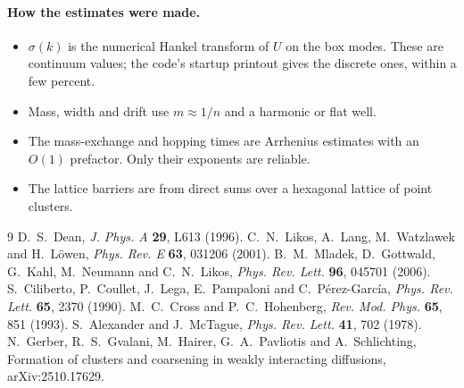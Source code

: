 \documentclass[11pt]{article}
\begin{document}
\paragraph{How the estimates were made.}
\begin{itemize}
  \item $\sigma(k)$ is the numerical Hankel transform of $U$ on the box modes.
        These are continuum values; the code's startup printout gives the
        discrete ones, within a few percent.
  \item Mass, width and drift use $m\approx1/n$ and a harmonic or flat well.
  \item The mass-exchange and hopping times are Arrhenius estimates with an
        $O(1)$ prefactor. Only their exponents are reliable.
  \item The lattice barriers are from direct sums over a hexagonal lattice of
        point clusters.
\end{itemize}

\begin{thebibliography}{9}
 D.~S.~Dean, \emph{J. Phys. A} \textbf{29}, L613 (1996).
 C.~N.~Likos, A.~Lang, M.~Watzlawek and H.~Löwen,
  \emph{Phys. Rev. E} \textbf{63}, 031206 (2001).
 B.~M.~Mladek, D.~Gottwald, G.~Kahl, M.~Neumann and
  C.~N.~Likos, \emph{Phys. Rev. Lett.} \textbf{96}, 045701 (2006).
 S.~Ciliberto, P.~Coullet, J.~Lega, E.~Pampaloni and
  C.~P\'erez-Garc\'ia, \emph{Phys. Rev. Lett.} \textbf{65}, 2370 (1990).
 M.~C.~Cross and P.~C.~Hohenberg, \emph{Rev. Mod. Phys.}
  \textbf{65}, 851 (1993).
 S.~Alexander and J.~McTague, \emph{Phys. Rev. Lett.}
  \textbf{41}, 702 (1978).
 N.~Gerber, R.~S.~Gvalani, M.~Hairer, G.~A.~Pavliotis and
  A.~Schlichting, Formation of clusters and coarsening in weakly interacting
  diffusions, arXiv:2510.17629.
\end{thebibliography}
\end{document}
